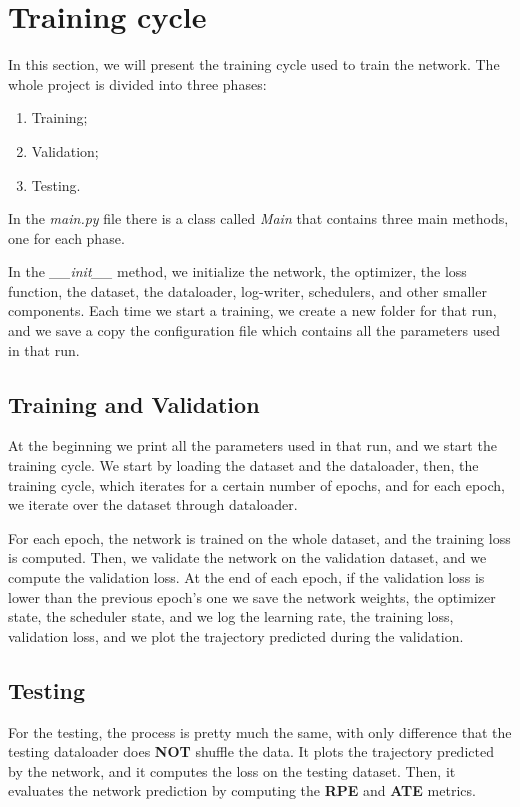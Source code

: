 \section{Training cycle}\label{sec:training-cycle}
In this section, we will present the training cycle used to train the network.
The whole project is divided into three phases:
\begin{enumerate}
    \item Training;
    \item Validation;
    \item Testing.
\end{enumerate}
In the \textit{main.py} file there is a class called \textit{Main} that contains three main methods, one for each phase.

In the \textit{\_\_init\_\_} method, we initialize the network, the optimizer, the loss function, the dataset, the dataloader, log-writer, schedulers, and other smaller components.
Each time we start a training, we create a new folder for that run, and we save a copy the configuration file which contains all the parameters used in that run.

\subsection{Training and Validation}\label{subsec:training}
At the beginning we print all the parameters used in that run, and we start the training cycle.
We start by loading the dataset and the dataloader, then, the training cycle, which iterates for a certain number of epochs, and for each epoch, we iterate over the dataset through dataloader.

For each epoch, the network is trained on the whole dataset, and the training loss is computed.
Then, we validate the network on the validation dataset, and we compute the validation loss.
At the end of each epoch, if the validation loss is lower than the previous epoch's one we save the network weights, the optimizer state, the scheduler state, and we log the learning rate, the training loss, validation loss, and we plot the trajectory predicted during the validation.

\subsection{Testing}\label{subsec:testing}

For the testing, the process is pretty much the same, with only difference that the testing dataloader does \textbf{NOT} shuffle the data.
It plots the trajectory predicted by the network, and it computes the loss on the testing dataset.
Then, it evaluates the network prediction by computing the \textbf{RPE} and \textbf{ATE} metrics.